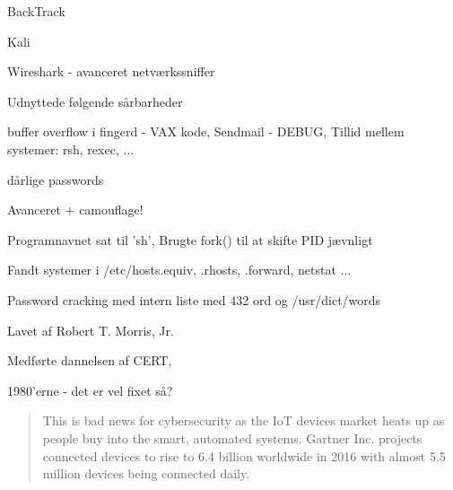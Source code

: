 \documentclass[20pt,landscape,a4paper]{foils}
\begin{document}


\begin{list1}
\item BackTrack 
\item Kali 
\item Wireshark -  avanceret netværkssniffer
\end{list1}






\begin{list1}
\item Udnyttede følgende sårbarheder
\begin{list2}
\item buffer overflow i fingerd - VAX kode, Sendmail - DEBUG, Tillid mellem systemer: rsh, rexec, ...
\item dårlige passwords
\end{list2}
\item Avanceret + camouflage!
\begin{list2}
\item Programnavnet sat til 'sh', Brugte fork() til at skifte PID jævnligt
\item Fandt systemer i /etc/hosts.equiv, .rhosts, .forward, netstat ...
\item Password cracking med intern liste med 432 ord og /usr/dict/words
\end{list2}
\item Lavet af Robert T. Morris, Jr.
\item Medførte dannelsen af CERT, 
\end{list1}

\centerline{1980'erne - det er vel fixet så?}



\begin{quote}
  This is bad news for cybersecurity as the IoT devices market heats up as people buy into the smart, automated systems. Gartner Inc. projects connected devices to rise to 6.4 billion worldwide in 2016 with almost 5.5 million devices being connected daily.
\end{quote}
\end{document}
